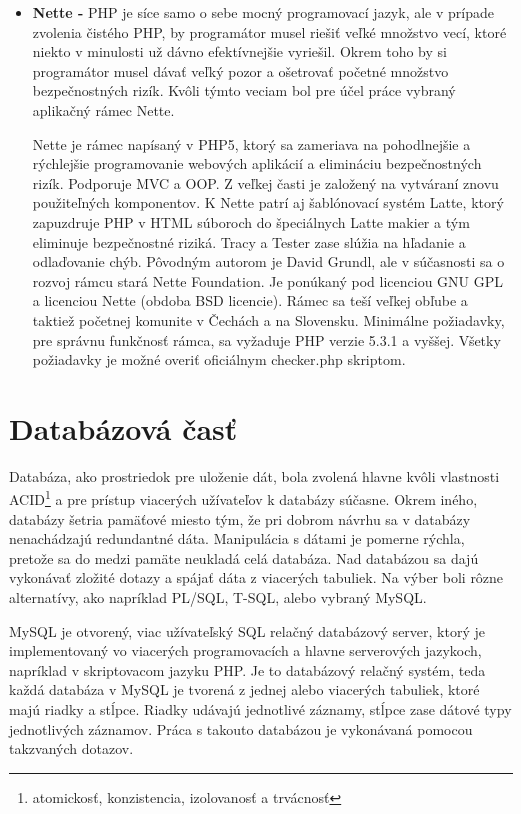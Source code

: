 \begin{itemize}
\item \textbf{Nette -} PHP je síce samo o sebe mocný programovací jazyk, ale v prípade zvolenia čistého PHP, by programátor musel riešiť veľké množstvo vecí, ktoré niekto v minulosti už dávno efektívnejšie vyriešil. Okrem toho by si programátor musel dávať veľký pozor a ošetrovať početné množstvo bezpečnostných rizík. Kvôli týmto veciam bol pre účel práce vybraný aplikačný rámec Nette.

Nette je rámec napísaný v PHP5, ktorý sa zameriava na pohodlnejšie a rýchlejšie programovanie webových aplikácií a elimináciu bezpečnostných rizík. Podporuje MVC a OOP. Z veľkej časti je založený na vytváraní znovu použiteľných komponentov. K Nette patrí aj šablónovací systém Latte, ktorý zapuzdruje PHP v HTML súboroch do špeciálnych Latte makier a tým eliminuje bezpečnostné riziká. Tracy a Tester zase slúžia na hľadanie a odlaďovanie chýb. Pôvodným autorom je David Grundl, ale v súčasnosti sa o rozvoj rámcu stará Nette Foundation. Je ponúkaný pod licenciou GNU GPL a licenciou Nette (obdoba BSD licencie). Rámec sa teší veľkej obľube a taktiež početnej komunite v Čechách a na Slovensku. Minimálne požiadavky, pre správnu funkčnosť rámca, sa vyžaduje PHP verzie 5.3.1 a vyššej. Všetky požiadavky je možné overiť oficiálnym checker.php skriptom. \cite{Grundl2009}

\end{itemize}

\section{Databázová časť}
\label{sec:databaza}
Databáza, ako prostriedok pre uloženie dát, bola zvolená hlavne kvôli vlastnosti ACID\footnote{atomickosť, konzistencia, izolovanosť a trvácnosť} a pre prístup viacerých užívateľov k databázy súčasne. Okrem iného, databázy šetria pamäťové miesto tým, že pri dobrom návrhu sa v databázy nenachádzajú redundantné dáta. Manipulácia s dátami je pomerne rýchla, pretože sa do medzi pamäte neukladá celá databáza. Nad databázou sa dajú vykonávať zložité dotazy a spájať dáta z viacerých tabuliek.  Na výber boli rôzne alternatívy, ako napríklad PL/SQL, T-SQL, alebo vybraný MySQL.   

MySQL je otvorený, viac užívateľský SQL relačný databázový server, ktorý je implementovaný vo viacerých programovacích a hlavne serverových jazykoch, napríklad v skriptovacom jazyku PHP. Je to databázový relačný systém, teda každá databáza v MySQL je tvorená z jednej alebo viacerých tabuliek, ktoré majú riadky a stĺpce. Riadky udávajú jednotlivé záznamy, stĺpce zase dátové typy jednotlivých záznamov. Práca s takouto databázou je vykonávaná pomocou takzvaných dotazov.

